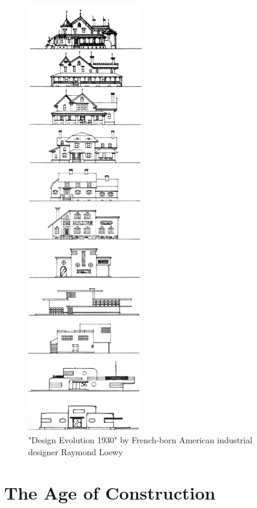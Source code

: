 \documentclass{article}
\begin{document}
\begin{minipage}{0.35\textwidth}
    \begin{figure}[H]
    \includegraphics[width=50mm]{./figures/loewy_architecture.png}
    \caption{
        "Design Evolution 1930" by French-born American industrial designer Raymond Loewy \cite{loewy_industrial_1979}
    }
    \label{fig:loewy}
    \end{figure}
\end{minipage}

\clearpage
\section{The Age of Construction}
\label{sec:construction}
\end{document}
